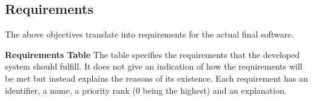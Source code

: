
\subsection{Requirements}

The above objectives translate into requirements for the actual final software.

\textbf{Requirements Table} The table specifies the requirements that the developed system should fulfill. It does not give an indication of how the requirements will be met but instead explains the reasons of its existence. Each requirement has an identifier, a name, a priority rank (0 being the highest) and an explanation.

